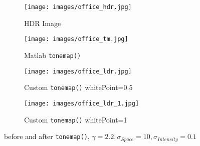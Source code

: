 \begin{figure}[htbp]
    \centering 
    \begin{minipage}{0.8\textwidth} 
        \centering 
        
        \begin{subfigure}[b]{0.45\linewidth} 
            \texttt{[image: images/office\_hdr.jpg]}
            \caption{HDR Image}
        \end{subfigure}
        \hfill
        \begin{subfigure}[b]{0.45\linewidth}
            \texttt{[image: images/office\_tm.jpg]}
            \caption{Matlab \texttt{tonemap()}}
        \end{subfigure}

        \vspace{0.5cm}
        \begin{subfigure}[b]{0.45\linewidth}
            \texttt{[image: images/office\_ldr.jpg]}
            \caption{Custom \texttt{tonemap()} whitePoint=0.5}
        \end{subfigure}
        \hfill
        \begin{subfigure}[b]{0.45\linewidth}
            \texttt{[image: images/office\_ldr\_1.jpg]}
            \caption{Custom \texttt{tonemap()} whitePoint=1}
        \end{subfigure}

        \caption{before and after \texttt{tonemap()}, $\gamma=2.2, \sigma_{Space}=10, \sigma_{Intensity}=0.1$}
        \label{fig:office}
    \end{minipage}
\end{figure}

